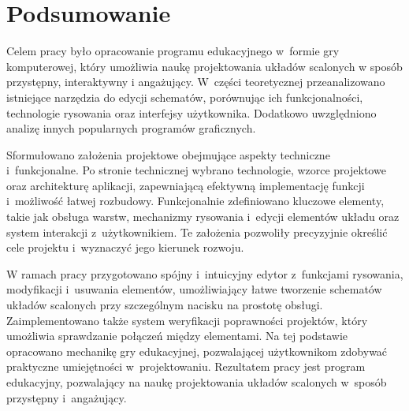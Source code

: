 \chapter{Podsumowanie}
\label{ch:podsumowanie}

Celem pracy było opracowanie programu edukacyjnego w~formie gry komputerowej,
który umożliwia naukę projektowania układów scalonych w sposób przystępny, interaktywny i angażujący.
W~części teoretycznej przeanalizowano istniejące narzędzia do edycji schematów,
porównując ich funkcjonalności, technologie rysowania oraz interfejsy użytkownika.
Dodatkowo uwzględniono analizę innych popularnych programów graficznych.


Sformułowano założenia projektowe obejmujące aspekty techniczne i~funkcjonalne.
Po stronie technicznej wybrano technologie,
wzorce projektowe oraz architekturę aplikacji,
zapewniającą efektywną implementację funkcji i~możliwość łatwej rozbudowy.
Funkcjonalnie zdefiniowano kluczowe elementy, takie jak obsługa warstw,
mechanizmy rysowania i~edycji elementów układu oraz system interakcji z~użytkownikiem.
Te założenia pozwoliły precyzyjnie określić cele projektu i~wyznaczyć jego kierunek rozwoju.


W ramach pracy przygotowano spójny i~intuicyjny edytor z~funkcjami rysowania,
modyfikacji i~usuwania elementów,
umożliwiający łatwe tworzenie schematów układów scalonych przy szczególnym nacisku na prostotę obsługi.
Zaimplementowano także system weryfikacji poprawności projektów,
który umożliwia sprawdzanie połączeń między elementami.
Na tej podstawie opracowano mechanikę gry edukacyjnej,
pozwalającej użytkownikom zdobywać praktyczne umiejętności w~projektowaniu.
Rezultatem pracy jest program edukacyjny,
pozwalający na naukę projektowania układów scalonych w~sposób przystępny i~angażujący.


